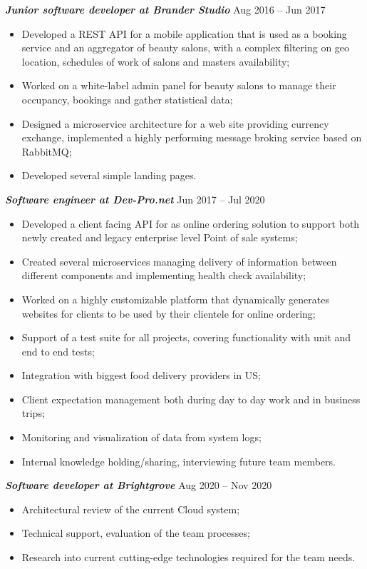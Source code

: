 \documentclass[margin, 10pt]{res} %
\begin{document}
\begin{resume}
{\sl \bf Junior software developer at Brander Studio} \hfill Aug 2016 -- Jun 2017
\begin{itemize}
 \item Developed a REST API  for a mobile application that is used as a booking service and an aggregator of beauty salons, with a complex filtering on geo location, schedules of work of salons and masters availability;
 \item Worked on a white-label admin panel for beauty salons to manage their occupancy, bookings and gather statistical data;
 \item Designed a microservice architecture for a web site providing currency exchange, implemented a highly performing message broking service based on RabbitMQ;
 \item Developed several simple landing pages.
\end{itemize} 
{\sl \bf  Software engineer at Dev-Pro.net } \hfill Jun 2017 -- Jul 2020
 \begin{itemize}
 \item Developed a client facing API for as online ordering solution to support both newly created and legacy enterprise level Point of sale systems;
 \item Created several microservices managing delivery of information between different components and implementing health check availability;
 \item Worked on a highly customizable platform that dynamically generates websites for clients to be used by their clientele for online ordering;
 \item Support of a test suite for all projects, covering functionality with unit and end to end tests;
 \item Integration with biggest food delivery providers in US;
 \item Client expectation management both during day to day work and in business trips;
 \item Monitoring and visualization of data from system logs;
 \item Internal knowledge holding/sharing, interviewing future team members.
\end{itemize}

{\sl \bf  Software developer at Brightgrove } \hfill Aug 2020 -- Nov 2020
\begin{itemize}
 \item Architectural review of the current Cloud system;
 \item Technical support, evaluation of the team processes;
 \item Research into current cutting-edge technologies required for the team needs.
\end{itemize}


\end{resume}
\end{document}
